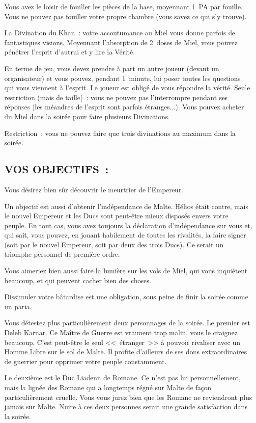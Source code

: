 \documentclass[14pt,twocolumn]{extarticle}
\begin{document}
Vous avez le loisir de fouiller les pièces de la base, moyennant 1~PA par
fouille. Vous ne pouvez pas fouiller votre propre chambre
(vous savez ce qui s'y trouve).

La Divination du Khan~: votre accoutumance au Miel vous donne parfois de
fantastiques visions. Moyennant l'absorption de 2~doses de Miel, vous pouvez
pénétrer l'esprit d'autrui et y lire la Vérité.

En terme de jeu, vous devez prendre à part un autre joueur (devant un
organisateur) et vous pouvez, pendant 1~minute, lui poser toutes les questions
qui vous viennent à l'esprit. Le joueur est obligé de vous répondre la vérité.
Seule restriction (mais de taille)~: vous ne pouvez pas l'interrompre pendant
ses réponses (les méandres de l'esprit sont parfois étranges...). Vous pouvez
acheter du Miel dans la soirée pour faire plusieurs Divinations.

Restriction~: vous ne pouvez faire que trois divinations au maximum dans la
soirée.

\subsection{VOS OBJECTIFS~:}

Vous désirez bien sûr découvrir le meurtrier de l'Empereur. 

Un objectif est aussi d'obtenir l'indépendance de Malte. Hélios était contre,
mais le nouvel Empereur et les Ducs sont peut-être mieux disposés envers votre
peuple. En tout cas, vous avez toujours la déclaration d'indépendance sur vous
et, qui sait, vous pouvez, en jouant habilement de toutes les rivalités, la
faire signer (soit par le nouvel Empereur, soit par deux des trois Ducs). Ce
serait un triomphe personnel de première ordre.

Vous aimeriez bien aussi faire la lumière sur les vols de Miel, qui vous
inquiètent beaucoup, et qui peuvent cacher bien des choses.

Dissimuler votre bâtardise est une obligation, sous peine de finir la soirée
comme un paria.

Vous détestez plus particulièrement deux personnages de la soirée. Le premier
est Deleb Karnar. Ce Maître de Guerre est vraiment trop malin, vous le craignez
beaucoup. C'est peut-être le seul <<~étranger~>> à pouvoir rivaliser avec un
Homme Libre sur le sol de Malte. Il profite d'ailleurs de ses dons
extraordinaires de guerrier pour opprimer votre peuple constamment.

Le deuxième est le Duc Liadenn de Romane. Ce n'est pas lui personnellement,
mais la lignée des Romane qui a longtemps régné sur Malte de façon
particulièrement cruelle. Vous vous jurez bien que les Romane ne reviendront
plus jamais sur Malte. Nuire à ces deux personnes serait une grande
satisfaction dans la soirée. 
\end{document}
